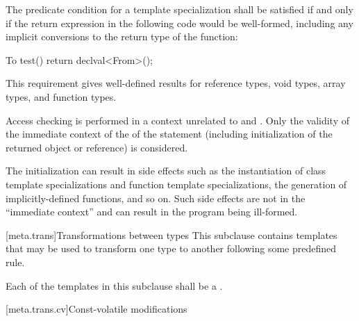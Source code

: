 %
\pnum
The predicate condition for a template specialization 
shall be satisfied if and only if the return expression in the following code would be
well-formed, including any implicit conversions to the return type of the function:

\begin{codeblock}
To test() {
  return declval<From>();
}
\end{codeblock}

\begin{note} This requirement gives well-defined results for reference types, void
types, array types, and function types.\end{note} Access checking is performed
in a context unrelated to  and . Only the validity of
the immediate context of the  of the  statement
(including initialization of the returned object or reference) is considered. \begin{note} The
initialization can result in side effects such as the
instantiation of class template specializations and function template
specializations, the generation of implicitly-defined functions, and so on. Such
side effects are not in the ``immediate context'' and can result in the program
being ill-formed. \end{note}

[meta.trans]{Transformations between types}
\pnum
This subclause contains templates that may be used to transform one
type to another following some predefined rule.

\pnum
Each of the templates in this subclause shall be a
.

[meta.trans.cv]{Const-volatile modifications}


